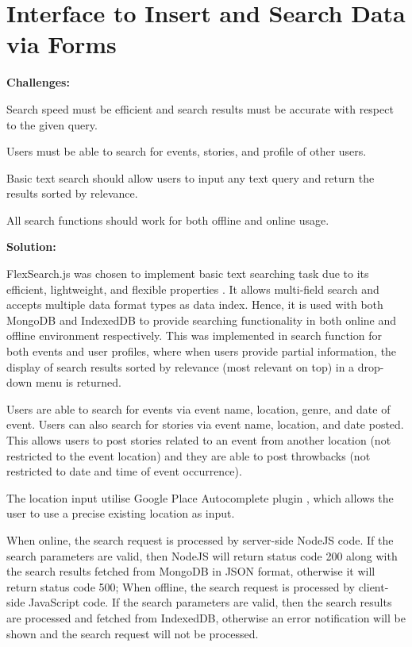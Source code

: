 \documentclass[11pt, a4paper]{article}
\begin{document}
\section{Interface to Insert and Search Data via Forms}
\textbf{Challenges:}
\begin{enumerate*}[label=\textbf{\arabic*})]
\item Search speed must be efficient and search results must be accurate with respect to the given
query.
\item Users must be able to search for events, stories, and profile of other users.
\item Basic text search should allow users to input any text query and return the results sorted by
relevance.
\item All search functions should work for both offline and online usage.
\end{enumerate*}
%
\textbf{Solution:}
\begin{enumerate*}[label=\textbf{\arabic*})]
\item FlexSearch.js \cite{flexsearch} was chosen to implement basic text searching task due to its
efficient, lightweight, and flexible properties \cite{flexsearch_benchmark}. It allows multi-field
search and accepts multiple data format types as data index. Hence, it is used with both MongoDB and
IndexedDB to provide searching functionality in both online and offline environment respectively.
This was implemented in search function for both events and user profiles, where when users provide
partial information, the display of search results sorted by relevance (most relevant on top) in a
drop-down menu is returned.
\item Users are able to search for events via event name, location, genre, and date of event. Users
can also search for stories via event name, location, and date posted. This allows users to post
stories related to an event from another location (not restricted to the event location) and they
are able to post throwbacks (not restricted to date and time of event occurrence).
\item The location input utilise Google Place Autocomplete plugin \cite{google_maps_api}, which
allows the user to use a precise existing location as input.
\item When online, the search request is processed by server-side NodeJS code. If the search
parameters are valid, then NodeJS will return status code 200 along with the search results fetched
from MongoDB in JSON format, otherwise it will return status code 500; When offline, the search
request is processed by client-side JavaScript code. If the search parameters are valid, then the
search results are processed and fetched from IndexedDB, otherwise an error notification will be
shown and the search request will not be processed.
\end{enumerate*}
\end{document}
